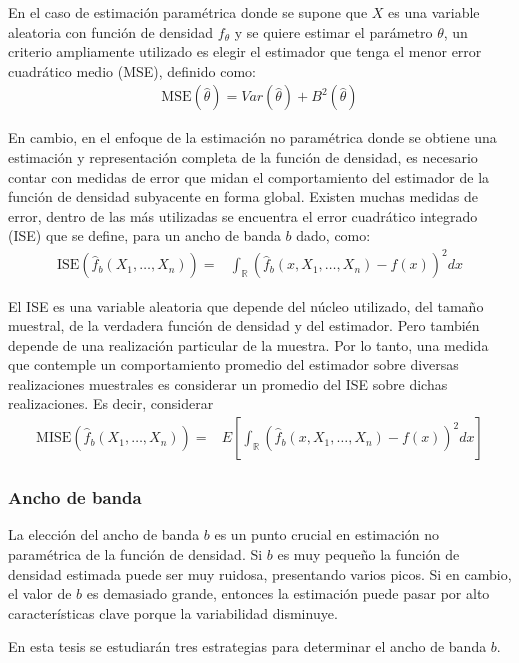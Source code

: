En el caso de estimación paramétrica donde se supone que $X$ es una variable aleatoria con función de densidad $f_{\theta}$ y se quiere estimar el parámetro $\theta$, un criterio ampliamente utilizado es elegir el estimador que tenga el menor error cuadrático medio (MSE), definido como:
\begin{align}
\text{MSE}(\hat{\theta})=Var(\hat{\theta})+B^2(\hat{\theta})
\end{align}	

En cambio, en el enfoque de la estimación no paramétrica donde se obtiene una estimación y representación completa de la función de densidad, es necesario contar con medidas de error que midan el comportamiento del estimador de la función de densidad subyacente en forma global. Existen muchas medidas de error, dentro de las más utilizadas se encuentra el error cuadrático integrado (ISE) que se define, para un ancho de banda $b$ dado, como:
\begin{align}
\text{ISE}(\widehat{f}_b(X_1,\ldots,X_n))=&\int_\mathbb{R} (\widehat{f}_b(x,X_1,\ldots,X_n)-f(x))^2 dx 
\end{align}

El ISE es una variable aleatoria que depende del núcleo utilizado, del tamaño muestral, de la verdadera función de densidad y del estimador. Pero también depende de una realización particular de la muestra. Por lo tanto, una medida que contemple un comportamiento promedio del estimador sobre diversas realizaciones muestrales es considerar un promedio del ISE sobre dichas realizaciones. Es decir, considerar
\begin{align}
	\text{MISE}(\widehat{f}_b(X_1,\ldots,X_n))=&E[\int_\mathbb{R} (\widehat{f}_b(x,X_1,\ldots,X_n)-f(x))^2 dx ]
\end{align}


\subsubsection{Ancho de banda}

La elección del ancho de banda $b$ es un punto crucial en estimación no paramétrica de la función de densidad. Si $b$ es muy pequeño la función de densidad estimada puede ser muy ruidosa, presentando varios picos. Si en cambio, el valor de $b$ es demasiado grande, entonces la estimación puede pasar por alto características clave porque la variabilidad disminuye.

En esta tesis se estudiarán tres estrategias para determinar el ancho de banda $b$.


